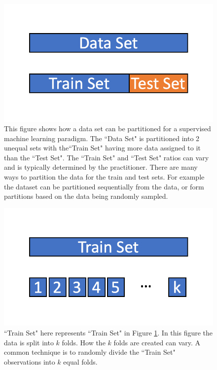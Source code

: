 \begin{figure}[!htb]
    \centering
      \centering
      \includegraphics[width=\textwidth]{figures/ppt/TrainTestSplit.png}
    \caption{
      This figure shows how a data set can be partitioned for a supervised machine learning paradigm. The ``Data Set" is partitioned into 2 unequal sets with the``Train Set" having more data assigned to it than the ``Test Set". The ``Train Set" and ``Test Set" ratios can vary and is typically determined by the practitioner. There are many ways to partition the data for the train and test sets. For example the dataset can be partitioned sequentially from the data, or form partitions based on the data being randomly sampled.
      }
\label{fig:TrainTestSplit}

  \end{figure}


\begin{figure}[!htb]
    \centering
      \centering
      \includegraphics[width=\textwidth]{figures/ppt/KFoldValidation.png}
    \caption{
	``Train Set" here represents ``Train Set" in Figure \ref{fig:TrainTestSplit}. In this figure the data is split into \(k\) folds. How the \(k\) folds are created can vary. A common technique is to randomly divide the ``Train Set" observations into \(k\) equal folds.
      }
     \label{fig:KFoldValidation}
  \end{figure}

